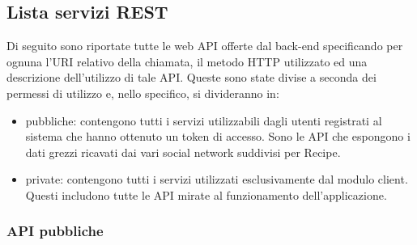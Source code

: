 \subsection{Lista servizi REST}
\label{sub:lista_servizi_rest}

Di seguito sono riportate tutte le web API offerte dal back-end specificando per ognuna l'URI relativo della chiamata, il metodo HTTP utilizzato ed una descrizione dell'utilizzo di tale API. Queste sono state divise a seconda dei permessi di utilizzo e, nello specifico, si divideranno in:
\begin{itemize}
  \item pubbliche: contengono tutti i servizi utilizzabili dagli utenti registrati al sistema che hanno ottenuto un token di accesso. Sono le API che espongono i dati grezzi ricavati dai vari social network suddivisi per Recipe.
  \item private: contengono tutti i servizi utilizzati esclusivamente dal modulo client. Questi includono tutte le API mirate al funzionamento dell'applicazione.
\end{itemize}


\subsubsection{API pubbliche}
\label{ssub:api_pubbliche}

